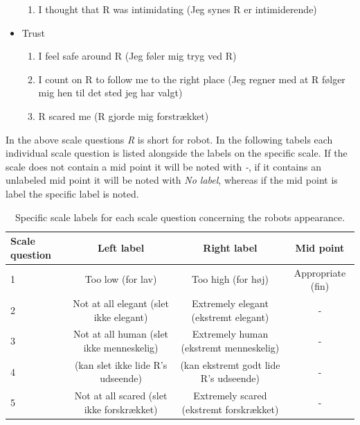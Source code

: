 \begin{itemize}
\begin{enumerate}
  \item I thought that R was intimidating (Jeg synes R er intimiderende)
\end{enumerate}
\item Trust 
\begin{enumerate}
  \item I feel safe around R (Jeg føler mig tryg ved R)
  \item I count on R to follow me to the right place (Jeg regner med at R følger mig hen til det sted jeg har valgt)
  \item R scared me (R gjorde mig forstrækket)\\
\end{enumerate}
\end{itemize}
%
In the above scale questions \textit{R} is short for robot. In the following tabels each individual scale question is listed alongside the labels on the specific scale. If the scale does not contain a mid point it will be noted with \textit{-}, if it contains an unlabeled mid point it will be noted with \textit{No label}, whereas if the mid point is label the specific label is noted. 
%
\begin{table}[H]
	\centering
	\begin{tabular}{l|c|c|c}
		Scale question     & Left label & Right label & Mid point \\\hline
		1   & Too low (for lav) & Too high (for høj) & Appropriate (fin)         \\\hline
		2   & Not at all elegant (slet ikke elegant) & Extremely elegant (ekstremt elegant) & -         \\\hline
		3   & Not at all human (slet ikke menneskelig) & Extremely human (ekstremt menneskelig) & -         \\\hline
	 	4   & (kan slet ikke lide R's udseende) & (kan ekstremt godt lide R's udseende) & -         \\\hline
		5   & Not at all scared (slet ikke forskrækket) & Extremely scared (ekstremt forskrækket) & -           
	\end{tabular}
	\caption{Specific scale labels for each scale question concerning the robots appearance.}
	\label{tab:Latin}         
\end{table}
\noindent
%

